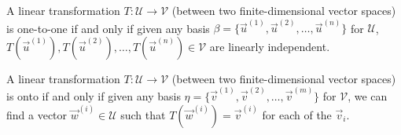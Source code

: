 \begin{thm}
\label{thm:oneto_onebasis}
A linear transformation $T: \mathcal{U} \to \mathcal{V}$ (between two finite-dimensional vector spaces) is one-to-one if and only if given any basis $\mathcal{\beta} = \{\vec{u}^{(1)}, \vec{u}^{(2)}, \ldots, \vec{u}^{(n)}\}$ for $\mathcal{U}$, $T(\vec{u}^{(1)}), T(\vec{u}^{(2)}), \ldots, T(\vec{u}^{(n)}) \in \mathcal{V}$ are linearly independent.
\end{thm}
\begin{thm}
\label{thm:onto_basis}
A linear transformation $T: \mathcal{U} \to \mathcal{V}$ (between two finite-dimensional vector spaces) is onto if and only if given any basis $\mathcal{\eta} = \{\vec{v}^{(1)}, \vec{v}^{(2)}, \ldots, \vec{v}^{(m)}\}$ for $\mathcal{V}$, we can find a vector $\vec{w}^{(i)} \in \mathcal{U}$ such that $T(\vec{w}^{(i)}) = \vec{v}^{(i)}$ for each of the $\vec{v}_i$.
\end{thm}
